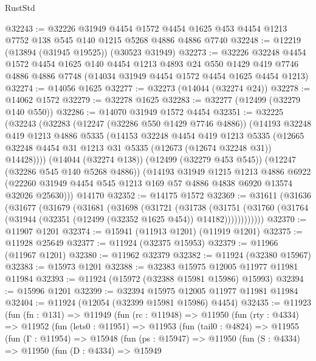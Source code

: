 \begin{lexlean}{RustStd}
\begin{coremodule}
@32243 := @32226
    @31949
    @4454
    @1572
    @4454
    @1625
    @453
    @4454
    @1213
    @7752
    @138
    @545
    @140
    @1215
    @5268
    @4886
    @4886
    @7740
@32248 := @12219 (@13894 (@31945 @19525)) (@30523 @31949)
@32273 := @32226
    @32248
    @4454
    @1572
    @4454
    @1625
    @140
    @4454
    @1213
    @4893
    @24
    @550
    @1429
    @419
    @7746
    @4886
    @4886
    @7748
    (@14034 @31949 @4454 @1572 @4454 @1625 @4454 @1213)
@32274 := @14056 @1625
@32277 := @32273 (@14044 (@32274 @24))
@32278 := @14062 @1572
@32279 := @32278 @1625
@32283 := @32277 (@12499 (@32279 @140 @550))
@32286 := @14070 @31949 @1572 @4454
@32351 := @32225
    (@32243
      (@32283
        (@12247 (@32286 @550 @1429 @7746 @4886))
        (@14193
          @32248
          @419
          @1213
          @4886
          @5335
          (@14153
            @32248
            @4454
            @419
            @1213
            @5335
            (@12665 @32248 @4454 @31 @1213 @31 @5335 (@12673 (@12674 @32248 @31)) @14428))))
      (@14044 (@32274 @138))
      (@12499 (@32279 @453 @545))
      (@12247 (@32286 @545 @140 @5268 @4886))
      (@14193
        @31949
        @1215
        @1213
        @4886
        @6922
        (@22260 @31949 @4454 @545 @1213 @169 @57 @4886 @4838 @6920 @13574 @32026 @25630)))
    @14170
@32352 := @14175 @1572
@32369 := @31611
    (@31636
      (@31677
        (@31679
          (@31681
            (@31698
              (@31721
                (@31738
                  (@31751
                    (@31760 (@31764 (@31944 (@32351 (@12499 (@32352 @1625 @454)) @14182))))))))))))
@32370 := @11907 @1201
@32374 := @15941 (@11913 @1201) (@11919 @1201)
@32375 := @11928 @25649
@32377 := @11924 (@32375 @15953)
@32379 := @11966 (@11967 @1201)
@32380 := @11962 @32379
@32382 := @11924 (@32380 @15967)
@32383 := @15973 @1201
@32388 := @32383 @15975 @12005 @11977 @11981 @11984
@32393 := @11924 (@15972 (@32388 @15981 @15986) @15993)
@32394 := @15996 @1201
@32399 := @32394 @15975 @12005 @11977 @11981 @11984
@32404 := @11924 (@12054 (@32399 @15981 @15986) @4454)
@32435 := @11923
    (fun (fn : @131) =>
    @11949
      (fun (rc : @11948) =>
      @11950
        (fun (rty : @4334) =>
        @11952
          (fun (lets0 : @11951) =>
          @11953
            (fun (tail0 : @4824) =>
            @11955
              (fun (Γ : @11954) =>
              @15948
                (fun (ps : @15947) =>
                @11950
                  (fun (S : @4334) =>
                  @11950
                    (fun (D : @4334) =>
                    @15949

\end{coremodule}
\end{lexlean}
